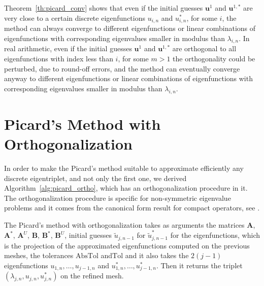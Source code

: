 \documentclass[preprint,12pt]{elsarticle}
\begin{document}
Theorem~\ref{th:picard_conv} shows that even if the initial guesses $\mathbf{u}^1$ and $\mathbf{u}^{1,*}$ are very close to a certain discrete eigenfunctions $u_{i,n}$ and $u_{i,n}^*$, for some $i$, the method can always converge to different eigenfunctions or linear combinations of eigenfunctions with corresponding eigenvalues smaller in modulus than $\lambda_{i,n}$. In real arithmetic, even if the initial guesses $\mathbf{u}^1$ and $\mathbf{u}^{1,*}$ are orthogonal to all eigenfunctions with index less than $i$, for some $m>1$ the orthogonality could be perturbed, due to round-off errors, and the method can eventually converge anyway to different eigenfunctions or linear combinations of eigenfunctions with corresponding eigenvalues smaller in modulus than $\lambda_{i,n}$.





\section{Picard's Method with Orthogonalization}\label{sec:picard++}

In order to make the Picard's method suitable to approximate efficiently any discrete eigentriplet, and not only the first one, we derived Algorithm~\ref{alg:picard_ortho}, which has an orthogonalization procedure in it. The orthogonalization procedure is specific for non-symmetric eigenvalue problems and it comes from the canonical form result for compact operators, see \cite[Theorem~9.17]{Hislop}.

The Picard's method with orthogonalization takes as arguments the matrices $\mathbf{A}$, $\mathbf{A}^*$, $\mathbf{A}^U$, $\mathbf{B}$, $\mathbf{B}^*$, $\mathbf{B}^U$,  initial guesses $\tilde u_{j,n-1}$ for $\tilde u_{j,n-1}^*$ for the eigenfunctions, which is the projection of the approximated eigenfunctions computed on the previous meshes, the tolerances  $\mathrm{AbsTol}$ and$\mathrm{Tol}$ and it also takes the $2(j-1)$ eigenfunctions $u_{1,n},\dots,u_{j-1,n}$ and  $u_{1,n}^*,\dots,u_{j-1,n}^*$.
Then it returns the triplet $(\lambda_{j,n},u_{j,n},u_{j,n}^*)$ on the refined mesh.
\end{document}
